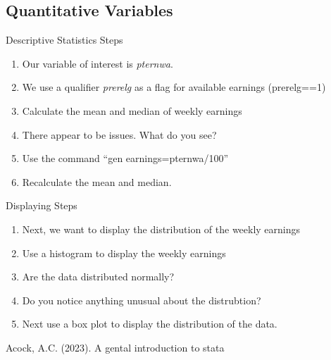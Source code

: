 \documentclass[
]{book}
\providecommand{\tightlist}{%
  \setlength{\itemsep}{0pt}\setlength{\parskip}{0pt}}
\begin{document}
\subsection{Quantitative Variables}\label{quantitative-variables-2}

Descriptive Statistics Steps

\begin{enumerate}
\def\labelenumi{\arabic{enumi}.}
\tightlist
\item
  Our variable of interest is \emph{pternwa}.
\item
  We use a qualifier \emph{prerelg} as a flag for available earnings (prerelg==1)
\item
  Calculate the mean and median of weekly earnings
\item
  There appear to be issues. What do you see?
\item
  Use the command ``gen earnings=pternwa/100''
\item
  Recalculate the mean and median.
\end{enumerate}

Displaying Steps

\begin{enumerate}
\def\labelenumi{\arabic{enumi}.}
\tightlist
\item
  Next, we want to display the distribution of the weekly earnings
\item
  Use a histogram to display the weekly earnings
\item
  Are the data distributed normally?
\item
  Do you notice anything unusual about the distrubtion?
\item
  Next use a box plot to display the distribution of the data.
\end{enumerate}

Acock, A.C. (2023). A gental introduction to stata


\end{document}
